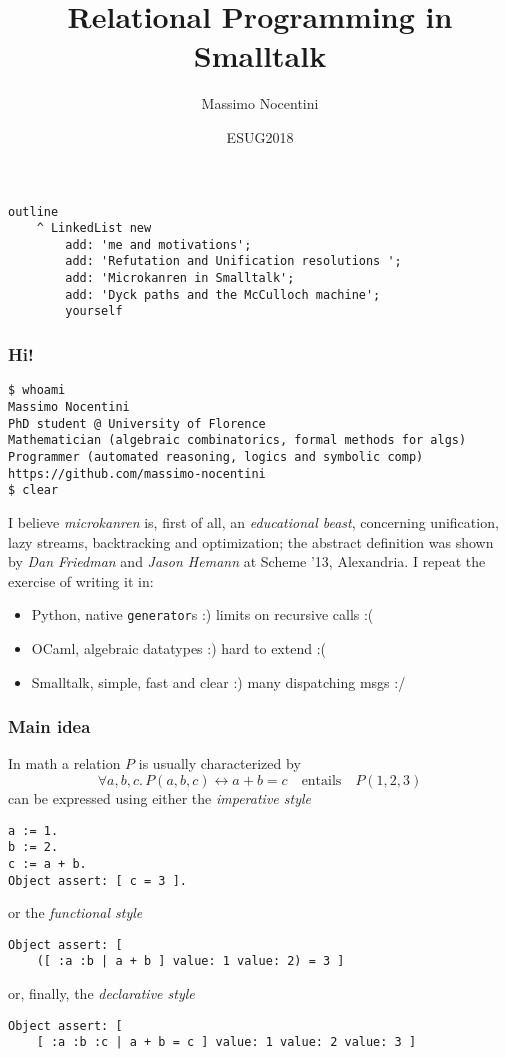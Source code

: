 \documentclass{beamer}
\title{Relational Programming in Smalltalk}
\author{Massimo Nocentini}
\institute{University of Florence, Italy}
\date{ESUG2018}
\begin{document}
\frame{\titlepage}

\begin{frame}[fragile]
\frametitle{}
\begin{verbatim}
outline
    ^ LinkedList new
        add: 'me and motivations';
        add: 'Refutation and Unification resolutions ';
        add: 'Microkanren in Smalltalk';
        add: 'Dyck paths and the McCulloch machine';
        yourself
\end{verbatim}
\end{frame}


\begin{frame}[fragile]
\frametitle{Hi!}
\begin{Verbatim}[fontsize=\small]
$ whoami
Massimo Nocentini
PhD student @ University of Florence
Mathematician (algebraic combinatorics, formal methods for algs)
Programmer (automated reasoning, logics and symbolic comp)
https://github.com/massimo-nocentini
$ clear
\end{Verbatim}
I believe \textit{microkanren} is, first of all, an \textit{educational beast},
concerning unification, lazy streams, backtracking and optimization; the
abstract definition was shown by \textit{Dan Friedman} and \textit{Jason
Hemann} at Scheme '13, Alexandria.
\vfill
I repeat the exercise of writing it in:
\begin{itemize}
\item Python, native \verb|generator|s :) limits on recursive calls :(
\item OCaml, algebraic datatypes :) hard to extend :(
\item Smalltalk, simple, fast and clear :) many dispatching msgs :/
\end{itemize}

\end{frame}

\begin{frame}[fragile]
\frametitle{Main idea}
In math a relation $P$ is usually characterized by
\begin{displaymath}
\forall a,b,c.\,P(a,b,c) \leftrightarrow a + b = c \quad\text{entails}\quad P(1,2,3)
\end{displaymath}
can be expressed using either the \textit{imperative style}
\begin{verbatim}
a := 1.
b := 2.
c := a + b.
Object assert: [ c = 3 ].
\end{verbatim}
or the \textit{functional style}
\begin{verbatim}
Object assert: [
    ([ :a :b | a + b ] value: 1 value: 2) = 3 ]
\end{verbatim}
or, finally, the \textit{declarative style}
\begin{verbatim}
Object assert: [
    [ :a :b :c | a + b = c ] value: 1 value: 2 value: 3 ]
\end{verbatim}

\end{frame}
\end{document}
